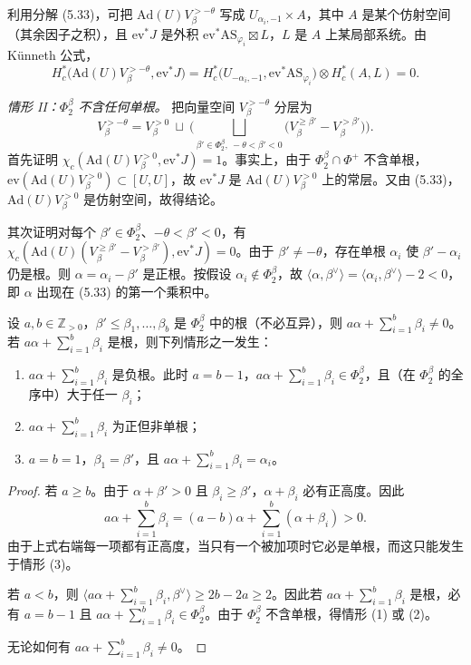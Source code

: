 利用分解 (5.33)，可把 $\mathrm{Ad}(U)V^{>-\theta}_\beta$ 写成 $U_{\alpha_i,-1}\times A$，其中 $A$ 是某个仿射空间（其余因子之积），且 $\mathrm{ev}^*J$ 是外积 $\mathrm{ev}^*\mathrm{AS}_{\varphi_i}\boxtimes L$，$L$ 是 $A$ 上某局部系统。由 Künneth 公式，
\[
H^*_c\big(\mathrm{Ad}(U)V^{>-\theta}_\beta,\mathrm{ev}^*J\big)=H^*_c\big(U_{-\alpha_i,-1},\mathrm{ev}^*\mathrm{AS}_{\varphi_i}\big)\otimes H^*_c(A,L)=0.
\]

\emph{情形 II：$\Phi^\beta_2$ 不含任何单根。} 把向量空间 $V^{>-\theta}_\beta$ 分层为
\[
V^{>-\theta}_\beta=V^{>0}_\beta\ \sqcup\ \Big(\bigsqcup_{\beta'\in\Phi^\beta_2,\ -\theta<\beta'<0}\big(V^{\ge\beta'}_\beta-V^{>\beta'}_\beta\big)\Big).
\]
首先证明 $\chi_c(\mathrm{Ad}(U)V^{>0}_\beta,\mathrm{ev}^*J)=1$。事实上，由于 $\Phi^\beta_2\cap\Phi^+$ 不含单根，$\mathrm{ev}(\mathrm{Ad}(U)V^{>0}_\beta)\subset[U,U]$，故 $\mathrm{ev}^*J$ 是 $\mathrm{Ad}(U)V^{>0}_\beta$ 上的常层。又由 (5.33)，$\mathrm{Ad}(U)V^{>0}_\beta$ 是仿射空间，故得结论。

其次证明对每个 $\beta'\in\Phi^\beta_2$、$-\theta<\beta'<0$，有 $\chi_c(\mathrm{Ad}(U)(V^{\ge\beta'}_\beta-V^{>\beta'}_\beta),\mathrm{ev}^*J)=0$。由于 $\beta'\neq-\theta$，存在单根 $\alpha_i$ 使 $\beta'-\alpha_i$ 仍是根。则 $\alpha=\alpha_i-\beta'$ 是正根。按假设 $\alpha_i\notin\Phi^\beta_2$，故 $\langle\alpha,\beta^\vee\rangle=\langle\alpha_i,\beta^\vee\rangle-2<0$，即 $\alpha$ 出现在 (5.33) 的第一个乘积中。

\begin{lemma}
设 $a,b\in\mathbb{Z}_{>0}$，$\beta'\le\beta_1,\dots,\beta_b$ 是 $\Phi^\beta_2$ 中的根（不必互异），则 $a\alpha+\sum_{i=1}^b\beta_i\neq 0$。若 $a\alpha+\sum_{i=1}^b\beta_i$ 是根，则下列情形之一发生：
\begin{enumerate}[label=(\arabic*), leftmargin=1.9em, itemsep=.2em]
\item $a\alpha+\sum_{i=1}^b\beta_i$ 是负根。此时 $a=b-1$，$a\alpha+\sum_{i=1}^b\beta_i\in\Phi^\beta_2$，且（在 $\Phi^\beta_2$ 的全序中）大于任一 $\beta_i$；
\item $a\alpha+\sum_{i=1}^b\beta_i$ 为正但非单根；
\item $a=b=1$，$\beta_1=\beta'$，且 $a\alpha+\sum_{i=1}^b\beta_i=\alpha_i$。
\end{enumerate}
\end{lemma}

\begin{proof}
若 $a\ge b$。由于 $\alpha+\beta'>0$ 且 $\beta_i\ge\beta'$，$\alpha+\beta_i$ 必有正高度。因此
\[
a\alpha+\sum_{i=1}^b\beta_i=(a-b)\alpha+\sum_{i=1}^b(\alpha+\beta_i)>0.
\]
由于上式右端每一项都有正高度，当只有一个被加项时它必是单根，而这只能发生于情形 (3)。

若 $a<b$，则 $\langle a\alpha+\sum_{i=1}^b\beta_i,\beta^\vee\rangle\ge 2b-2a\ge 2$。因此若 $a\alpha+\sum_{i=1}^b\beta_i$ 是根，必有 $a=b-1$ 且 $a\alpha+\sum_{i=1}^b\beta_i\in\Phi^\beta_2$。由于 $\Phi^\beta_2$ 不含单根，得情形 (1) 或 (2)。

无论如何有 $a\alpha+\sum_{i=1}^b\beta_i\neq 0$。
\end{proof}

